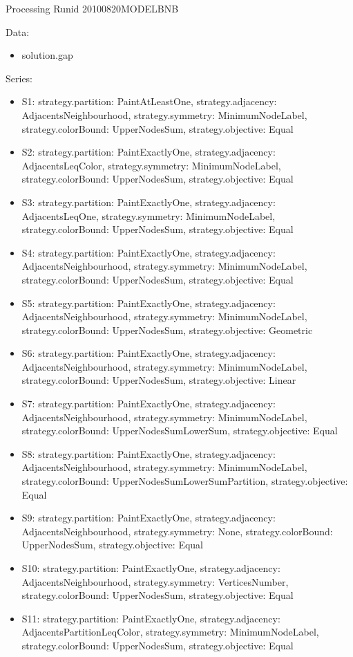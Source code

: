 \documentclass[landscape, 12pt]{report}
\begin{document}
	
	\clearpage
	
	Processing Runid 20100820MODELBNB

Data:
\begin{itemize}
\item solution.gap
\end{itemize}
Series:
\begin{itemize}
\item S1: strategy.partition: PaintAtLeastOne, strategy.adjacency: AdjacentsNeighbourhood, strategy.symmetry: MinimumNodeLabel, strategy.colorBound: UpperNodesSum, strategy.objective: Equal
\item S2: strategy.partition: PaintExactlyOne, strategy.adjacency: AdjacentsLeqColor, strategy.symmetry: MinimumNodeLabel, strategy.colorBound: UpperNodesSum, strategy.objective: Equal
\item S3: strategy.partition: PaintExactlyOne, strategy.adjacency: AdjacentsLeqOne, strategy.symmetry: MinimumNodeLabel, strategy.colorBound: UpperNodesSum, strategy.objective: Equal
\item S4: strategy.partition: PaintExactlyOne, strategy.adjacency: AdjacentsNeighbourhood, strategy.symmetry: MinimumNodeLabel, strategy.colorBound: UpperNodesSum, strategy.objective: Equal
\item S5: strategy.partition: PaintExactlyOne, strategy.adjacency: AdjacentsNeighbourhood, strategy.symmetry: MinimumNodeLabel, strategy.colorBound: UpperNodesSum, strategy.objective: Geometric
\item S6: strategy.partition: PaintExactlyOne, strategy.adjacency: AdjacentsNeighbourhood, strategy.symmetry: MinimumNodeLabel, strategy.colorBound: UpperNodesSum, strategy.objective: Linear
\item S7: strategy.partition: PaintExactlyOne, strategy.adjacency: AdjacentsNeighbourhood, strategy.symmetry: MinimumNodeLabel, strategy.colorBound: UpperNodesSumLowerSum, strategy.objective: Equal
\item S8: strategy.partition: PaintExactlyOne, strategy.adjacency: AdjacentsNeighbourhood, strategy.symmetry: MinimumNodeLabel, strategy.colorBound: UpperNodesSumLowerSumPartition, strategy.objective: Equal
\item S9: strategy.partition: PaintExactlyOne, strategy.adjacency: AdjacentsNeighbourhood, strategy.symmetry: None, strategy.colorBound: UpperNodesSum, strategy.objective: Equal
\item S10: strategy.partition: PaintExactlyOne, strategy.adjacency: AdjacentsNeighbourhood, strategy.symmetry: VerticesNumber, strategy.colorBound: UpperNodesSum, strategy.objective: Equal
\item S11: strategy.partition: PaintExactlyOne, strategy.adjacency: AdjacentsPartitionLeqColor, strategy.symmetry: MinimumNodeLabel, strategy.colorBound: UpperNodesSum, strategy.objective: Equal
\end{itemize}
\end{document}
